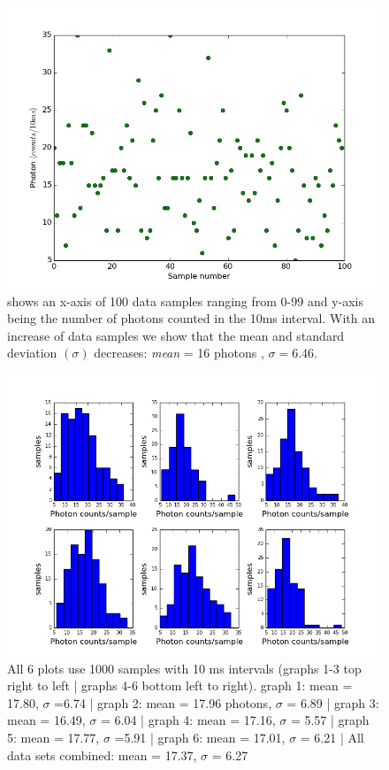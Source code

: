 \documentclass[12 pt,twoside]{article}
\begin{document}
\begin{center}
\begin{figure}[!hb]
\includegraphics[scale=0.7]{figure_2}
\caption{\small shows an x-axis of 100 data samples ranging from 0-99 and y-axis being the number of photons counted in the 10ms interval. With an increase of data samples we show that the mean and standard deviation $(\sigma)$ decreases: {\it mean} = 16 photons , $\sigma = 6.46$.}
\end{figure}
\end{center}

\begin{center}
\begin{figure}[!hb]
\includegraphics[scale=0.7]{figure_3}
\caption{\small All 6 plots use 1000 samples with 10 ms intervals (graphs 1-3 top right to left | graphs 4-6 bottom left to right). graph 1: mean = 17.80, $\sigma$ =6.74 | graph 2: mean = 17.96 photons, $\sigma$ = 6.89 | graph 3: mean = 16.49, $\sigma$ = 6.04 | graph 4: mean = 17.16, $\sigma$ = 5.57  | graph 5: mean = 17.77, $\sigma$ =5.91 | graph 6: mean = 17.01, $\sigma$ = 6.21 | All data sets combined: mean = 17.37, $\sigma$ = 6.27}
\end{figure}
\end{center}
\end{document}
